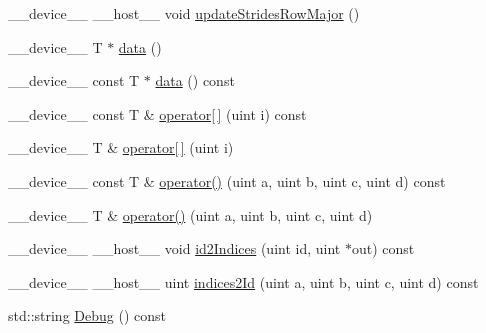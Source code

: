\begin{DoxyCompactItemize}
\item 
\+\_\+\+\_\+device\+\_\+\+\_\+ \+\_\+\+\_\+host\+\_\+\+\_\+ void \hyperlink{classamunmt_1_1GPU_1_1mblas_1_1MatrixWrapper_a1ac84e1638525648f6eba2f995fb34cb}{update\+Strides\+Row\+Major} ()
\item 
\+\_\+\+\_\+device\+\_\+\+\_\+ T $\ast$ \hyperlink{classamunmt_1_1GPU_1_1mblas_1_1MatrixWrapper_a8bac878980ee8e229281d2eb267c0c1b}{data} ()
\item 
\+\_\+\+\_\+device\+\_\+\+\_\+ const T $\ast$ \hyperlink{classamunmt_1_1GPU_1_1mblas_1_1MatrixWrapper_a41904dfb844d082ed03466c64412c31c}{data} () const 
\item 
\+\_\+\+\_\+device\+\_\+\+\_\+ const T \& \hyperlink{classamunmt_1_1GPU_1_1mblas_1_1MatrixWrapper_a1103bd1708bdb389f581f4c4f27e6dcd}{operator\mbox{[}$\,$\mbox{]}} (uint i) const 
\item 
\+\_\+\+\_\+device\+\_\+\+\_\+ T \& \hyperlink{classamunmt_1_1GPU_1_1mblas_1_1MatrixWrapper_ad54c816f0eefa37f9155b580e8c2e0b1}{operator\mbox{[}$\,$\mbox{]}} (uint i)
\item 
\+\_\+\+\_\+device\+\_\+\+\_\+ const T \& \hyperlink{classamunmt_1_1GPU_1_1mblas_1_1MatrixWrapper_aca5da79a1954635935a880cfdf84b35c}{operator()} (uint a, uint b, uint c, uint d) const 
\item 
\+\_\+\+\_\+device\+\_\+\+\_\+ T \& \hyperlink{classamunmt_1_1GPU_1_1mblas_1_1MatrixWrapper_ad20ebf908142f588bcd42edaad002fa9}{operator()} (uint a, uint b, uint c, uint d)
\item 
\+\_\+\+\_\+device\+\_\+\+\_\+ \+\_\+\+\_\+host\+\_\+\+\_\+ void \hyperlink{classamunmt_1_1GPU_1_1mblas_1_1MatrixWrapper_a1e70b609eca106cb5a161d8cc186cf07}{id2\+Indices} (uint id, uint $\ast$out) const 
\item 
\+\_\+\+\_\+device\+\_\+\+\_\+ \+\_\+\+\_\+host\+\_\+\+\_\+ uint \hyperlink{classamunmt_1_1GPU_1_1mblas_1_1MatrixWrapper_a09c3749fd756b2b72de447ef5ee66cfa}{indices2\+Id} (uint a, uint b, uint c, uint d) const 
\item 
std\+::string \hyperlink{classamunmt_1_1GPU_1_1mblas_1_1MatrixWrapper_afa181ca54a0a16e376f27cc2ba2fac9d}{Debug} () const 
\end{DoxyCompactItemize}
